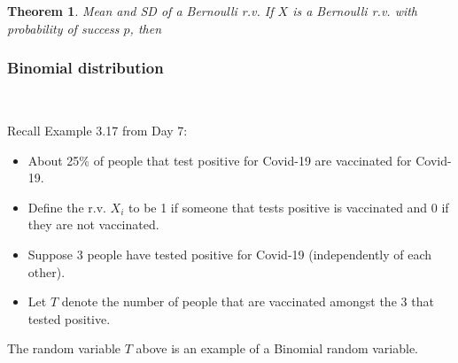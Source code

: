 \documentclass[12pt]{amsart}
\newtheorem{theorem}{Theorem}[section]
\begin{document}
{\begin{itemize}

\vspace{.25cm}
\end{itemize}




\begin{theorem}{Mean and SD of a Bernoulli r.v.} \newline
If $X$ is a Bernoulli r.v. with probability of success $p$, then 



\end{theorem}




\newpage
\subsubsection{Binomial distribution}  $ \ $



\vspace{0.5cm}
Recall Example 3.17 from Day 7:
\begin{itemize}
\item About 25\% of people that test positive for Covid-19 are vaccinated for Covid-19.
\item Define the r.v. $X_i$ to be 1 if someone that tests positive is vaccinated and 0 if they are not vaccinated. 
\item Suppose 3 people have tested positive for Covid-19 (independently of each other). 
\item Let $T$ denote the number of people that are vaccinated amongst the 3 that tested positive.
\end{itemize}

\vspace{0.5cm}
The random variable $T$ above is an example of a Binomial random variable. \newline

}
\end{document}
